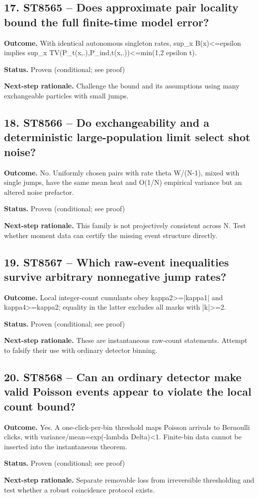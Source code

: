 \subsection*{17. ST8565 -- Does approximate pair locality bound the full finite-time model error?}
\noindent\textbf{Outcome.} With identical autonomous singleton rates, sup\_x B(x)\textless{}=epsilon implies sup\_x TV(P\_t(x,.),P\_ind,t(x,.))\textless{}=min(1,2 epsilon t).\par
\noindent\textbf{Status.} Proven (conditional; see proof)\par
\noindent\textbf{Next-step rationale.} Challenge the bound and its assumptions using many exchangeable particles with small jumps.\par\medskip
\subsection*{18. ST8566 -- Do exchangeability and a deterministic large-population limit select shot noise?}
\noindent\textbf{Outcome.} No. Uniformly chosen pairs with rate theta W/(N-1), mixed with single jumps, have the same mean heat and O(1/N) empirical variance but an altered noise prefactor.\par
\noindent\textbf{Status.} Proven (conditional; see proof)\par
\noindent\textbf{Next-step rationale.} This family is not projectively consistent across N. Test whether moment data can certify the missing event structure directly.\par\medskip
\subsection*{19. ST8567 -- Which raw-event inequalities survive arbitrary nonnegative jump rates?}
\noindent\textbf{Outcome.} Local integer-count cumulants obey kappa2\textgreater{}=|kappa1| and kappa4\textgreater{}=kappa2; equality in the latter excludes all marks with |k|\textgreater{}=2.\par
\noindent\textbf{Status.} Proven (conditional; see proof)\par
\noindent\textbf{Next-step rationale.} These are instantaneous raw-count statements. Attempt to falsify their use with ordinary detector binning.\par\medskip
\subsection*{20. ST8568 -- Can an ordinary detector make valid Poisson events appear to violate the local count bound?}
\noindent\textbf{Outcome.} Yes. A one-click-per-bin threshold maps Poisson arrivals to Bernoulli clicks, with variance/mean=exp(-lambda Delta)\textless{}1. Finite-bin data cannot be inserted into the instantaneous theorem.\par
\noindent\textbf{Status.} Proven (conditional; see proof)\par
\noindent\textbf{Next-step rationale.} Separate removable loss from irreversible thresholding and test whether a robust coincidence protocol exists.\par\medskip
